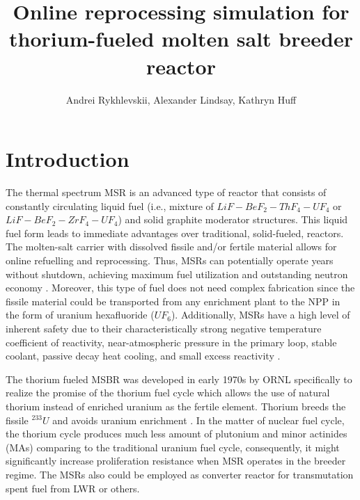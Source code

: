 \documentclass{anstrans}
\title{Online reprocessing simulation for thorium-fueled molten salt breeder 
reactor}
\author{Andrei Rykhlevskii, Alexander Lindsay, Kathryn Huff}
\institute{
        Department of Nuclear, Plasma, and Radiological Engineering, University 
        of Illinois at Urbana-Champaign \break
        Urbana, IL
}
\begin{document}
\section{Introduction}
The thermal spectrum \gls{MSR} is an advanced type of reactor that consists of 
constantly circulating liquid fuel (i.e., mixture of $LiF-BeF_2-ThF_4-UF_4$ or 
$LiF-BeF_2-ZrF_4-UF_4$) and solid graphite moderator structures. This liquid 
fuel form leads to immediate advantages over traditional, 
solid-fueled, reactors. The molten-salt carrier with dissolved 
fissile and/or fertile material allows for online refuelling and 
reprocessing. Thus, \gls{MSR}s can potentially operate years without shutdown, 
achieving maximum fuel utilization and outstanding neutron economy 
\cite{leblanc_molten_2010}. Moreover, this type of fuel does not need 
complex fabrication since the fissile material could be transported from any 
enrichment plant to the \gls{NPP} in the form 
of uranium hexafluoride ($UF_6$).  Additionally, \glspl{MSR} have a high level 
of inherent safety due to their characteristically 
strong negative temperature coefficient of reactivity, near-atmospheric 
pressure in the primary loop, stable coolant, passive decay heat cooling, and 
small excess reactivity \cite{elsheikh_safety_2013}.

The thorium fueled \gls{MSBR} was developed in early 1970s by \gls{ORNL} 
specifically to realize the promise of the thorium fuel cycle which allows the 
use of natural thorium instead of enriched uranium as the fertile element. 
Thorium breeds the fissile $^{233}U$ and avoids uranium enrichment 
\cite{robertson_conceptual_1971}. In the matter of nuclear fuel cycle, the 
thorium cycle produces much less amount of plutonium and minor actinides (MAs) 
comparing to the traditional uranium fuel cycle, consequently, it might 
significantly increase proliferation resistance when \gls{MSR} operates in the 
breeder regime. The \gls{MSR}s also could be employed as converter reactor for 
transmutation spent fuel from \gls{LWR} or others.
\end{document}
